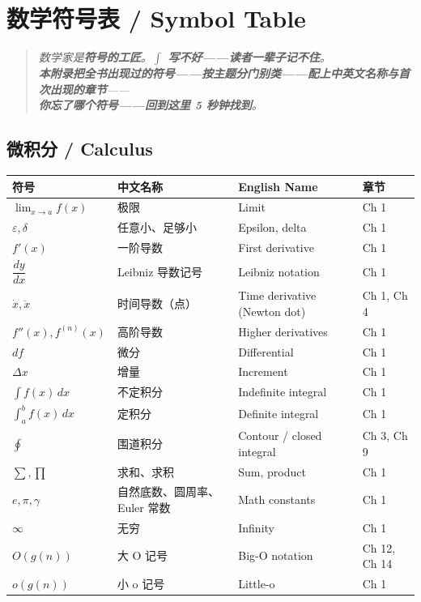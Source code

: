 
\chapter{数学符号表 / Symbol Table}
\label{app:symbols}

\begin{quote}\itshape
数学家是\textbf{符号的工匠}。\textbf{$\int$ 写不好——读者一辈子记不住}。\\
\textbf{本附录把全书出现过的符号——按主题分门别类——配上中英文名称与首次出现的章节}——\\
\textbf{你忘了哪个符号——回到这里 5 秒钟找到}。
\end{quote}

\section{微积分 / Calculus}

\begin{center}
\renewcommand{\arraystretch}{1.25}
\begin{tabular}{@{}llll@{}}
\toprule
\textbf{符号} & \textbf{中文名称} & \textbf{English Name} & \textbf{章节} \\
\midrule
$\displaystyle \lim_{x \to a} f(x)$ & 极限 & Limit & Ch 1 \\
$\varepsilon, \delta$ & 任意小、足够小 & Epsilon, delta & Ch 1 \\
$f'(x)$ & 一阶导数 & First derivative & Ch 1 \\
$\dfrac{dy}{dx}$ & Leibniz 导数记号 & Leibniz notation & Ch 1 \\
$\dot{x}, \ddot{x}$ & 时间导数（点） & Time derivative (Newton dot) & Ch 1, Ch 4 \\
$f''(x), f^{(n)}(x)$ & 高阶导数 & Higher derivatives & Ch 1 \\
$df$ & 微分 & Differential & Ch 1 \\
$\Delta x$ & 增量 & Increment & Ch 1 \\
$\displaystyle \int f(x)\,dx$ & 不定积分 & Indefinite integral & Ch 1 \\
$\displaystyle \int_a^b f(x)\,dx$ & 定积分 & Definite integral & Ch 1 \\
$\displaystyle \oint$ & 围道积分 & Contour / closed integral & Ch 3, Ch 9 \\
$\sum, \prod$ & 求和、求积 & Sum, product & Ch 1 \\
$e, \pi, \gamma$ & 自然底数、圆周率、Euler 常数 & Math constants & Ch 1 \\
$\infty$ & 无穷 & Infinity & Ch 1 \\
$O(g(n))$ & 大 O 记号 & Big-O notation & Ch 12, Ch 14 \\
$o(g(n))$ & 小 o 记号 & Little-o & Ch 1 \\
\bottomrule
\end{tabular}
\end{center}

